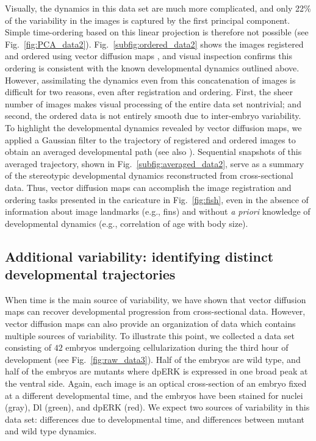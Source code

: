\documentclass{pnastwo}
\newcommand{\fig}[0]{Fig.}
\begin{document}
\begin{article}
Visually, the dynamics in this data set are much more complicated, and only 22\% of the variability in the images is captured by the first principal component.
%
Simple time-ordering based on this linear projection is therefore not possible (see \fig~\ref{fig:PCA_data2}).
%
%
\fig~\ref{subfig:ordered_data2} shows the images registered and ordered using vector diffusion maps \cite{singer2012vector}, 
and visual inspection confirms this ordering is consistent with the known developmental dynamics outlined above.
%
However, assimilating the dynamics even from this concatenation of images is difficult for two reasons, even after registration and ordering.
%
First, the sheer number of images makes visual processing of the entire data set nontrivial;
and second, the ordered data is not entirely smooth due to inter-embryo variability.
%
To highlight the developmental dynamics revealed by vector diffusion maps, we applied a Gaussian filter to the trajectory of registered and ordered images to obtain an averaged developmental path (see also \cite{kemelmacher2011exploring}).  
%
Sequential snapshots of this averaged trajectory, shown in \fig~\ref{subfig:averaged_data2}, serve as a summary of the stereotypic developmental dynamics reconstructed from cross-sectional data.
%
Thus, vector diffusion maps can accomplish the image registration and ordering tasks presented in the caricature in \fig~\ref{fig:fish}, even in the absence of information about image landmarks (e.g., fins) and without {\it a priori} knowledge of developmental dynamics (e.g., correlation of age with body size).



\subsection{Additional variability: identifying distinct developmental trajectories}

When time is the main source of variability, we have shown that vector diffusion maps can recover developmental progression from cross-sectional data.
%
However, vector diffusion maps can also provide an organization of data which contains multiple sources of variability.
%
To illustrate this point, we collected a data set consisting of $42$ embryos undergoing cellularization during the third hour of development (see \fig~\ref{fig:raw_data3}).
%
Half of the embryos are wild type, and half of the embryos are mutants where dpERK is expressed in one broad peak at the ventral side.
%
Again, each image is an optical cross-section of an embryo fixed at a different developmental time, and the embryos have been stained for nuclei (gray), Dl (green), and dpERK (red).
%
We expect two sources of variability in this data set: differences due to developmental time, and differences between mutant and wild type dynamics.





\end{article}
\end{document}
